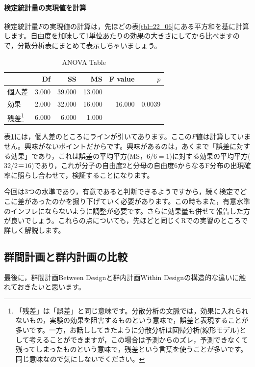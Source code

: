 \documentclass{ltjsarticle}
\begin{document}
  \paragraph{検定統計量の実現値を計算}検定統計量$F$の実現値の計算は，先ほどの表\ref{tbl::22_06}にある平方和を基に計算します。自由度を加味して1単位あたりの効果の大きさにしてから比べますので，分散分析表にまとめて表示しちゃいましょう。

\begin{table}[ht]
  \centering
  \caption{ANOVA Table} 
  \begin{tabular}{lrrrrr}
    \hline
   & Df & SS & MS & F value & $p$ \\ 
    \hline
  個人差          & 3.000 & 39.000 & 13.000 &  &  \\ \hline
    効果      & 2.000 & 32.000 & 16.000 & 16.000 & 0.0039 \\ 
   残差\footnote{「残差」は「誤差」と同じ意味です。分散分析の文脈では，効果に入れられないもの，実験の効果を阻害するものという意味で，誤差と表現することが多いです。一方，お話ししてきたように分散分析は回帰分析(線形モデル)として考えることができますが，この場合は予測からのズレ，予測できなくて残ってしまったものという意味で，残差という言葉を使うことが多いです。同じ意味なので気にしないでください。}     & 6.000 & 6.000 & 1.000 &  &  \\ 
     \hline
  \end{tabular}
    \label{tbl::22_08}
  \end{table}
表\ref{tbl::22_08}には，個人差のところにラインが引いてあります。ここの$F$値は計算していません。興味がないポイントだからです。興味があるのは，あくまで「誤差に対する効果」であり，これは誤差の平均平方(MS，$6/6=1$)に対する効果の平均平方($32/2＝16$)であり，これが分子の自由度2と分母の自由度6からなるF分布の出現確率に照らし合わせて，検証することになります。

今回は3つの水準であり，有意であると判断できるようですから，続く検定でどこに差があったのかを掘り下げていく必要があります。この時もまた，有意水準のインフレにならないように調整が必要です。さらに効果量も併せて報告した方が良いでしょう。これらの点についても，先ほどと同じくRでの実習のところで詳しく解説します。

\subsection{群間計画と群内計画の比較}
最後に，群間計画Between Designと群内計画Within Designの構造的な違いに触れておきたいと思います。
\end{document}
